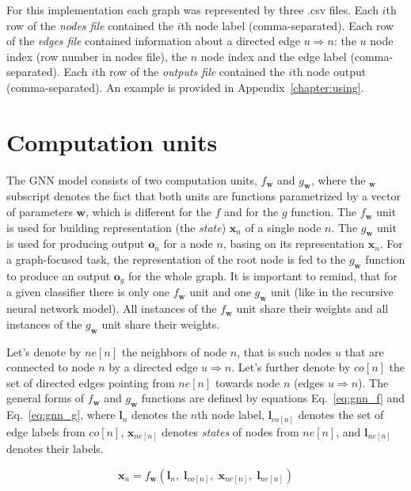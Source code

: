 For this implementation each graph was represented by three .csv files. Each $i$th row of the \emph{nodes file} contained the $i$th node label (comma-separated). Each row of the \emph{edges file} contained information about a directed edge $u \Rightarrow n$: the $u$ node index (row number in nodes file), the $n$ node index and the edge label (comma-separated). Each $i$th row of the \emph{outputs file} contained the $i$th node output (comma-separated). An example is provided in Appendix~\ref{chapter:using}.

\section{Computation units}
The GNN model consists of two computation units, $f_{\bm{w}}$ and $g_{\bm{w}}$, where the $_{\bm{w}}$ subscript denotes the fact that both units are functions parametrized by a vector of parameters $\bm{w}$, which is different for the $f$ and for the $g$ function. The $f_{\bm{w}}$ unit is used for building representation (the \emph{state}) $\bm{x}_n$ of a single node $n$. The $g_{\bm{w}}$ unit is used for producing output $\bm{o}_n$ for a node $n$, basing on its representation $\bm{x}_n$. For a graph-focused task, the representation of the root node is fed to the $g_{\bm{w}}$ function to produce an output $\bm{o}_g$ for the whole graph. It is important to remind, that for a given classifier there is only one $f_{\bm{w}}$ unit and one $g_{\bm{w}}$ unit (like in the recursive neural network model). All instances of the $f_{\bm{w}}$ unit share their weights and all instances of the $g_{\bm{w}}$ unit share their weights.

Let's denote by $ne[n]$ the neighbors of node $n$, that is such nodes $u$ that are connected to node $n$ by a directed edge $u \Rightarrow n$. Let's further denote by $co[n]$ the set of directed edges pointing from $ne[n]$ towards node $n$ (edges $u \Rightarrow n$). The general forms of $f_{\bm{w}}$ and $g_{\bm{w}}$ functions are defined by equations Eq.~\ref{eq:gnn_f} and Eq.~\ref{eq:gnn_g}, where $\bm{l}_n$ denotes the $n$th node label, $\bm{l}_{co[n]}$ denotes the set of edge labels from $co[n]$, $\bm{x}_{ne[n]}$ denotes \emph{states} of nodes from $ne[n]$, and $\bm{l}_{ne[n]}$ denotes their labels.

\begin{equation}
\bm{x}_n = f_{\bm{w}}(\bm{l}_n, \; \bm{l}_{co[n]}, \; \bm{x}_{ne[n]}, \; \bm{l}_{ne[n]})
\label{eq:gnn_f}
\end{equation}

